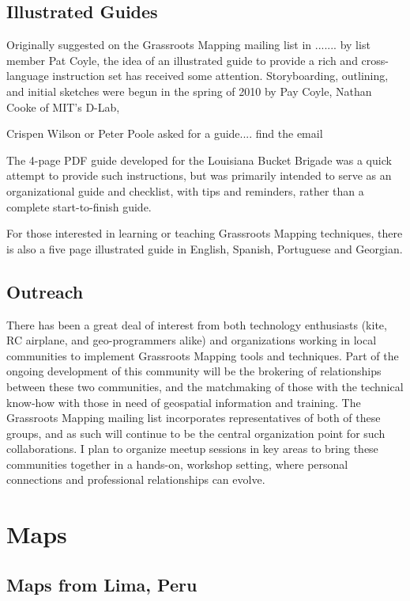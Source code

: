 \documentclass[11pt]{report}
\begin{document}
\section{Illustrated Guides}
\label{sec:guide}

Originally suggested on the Grassroots Mapping mailing list in ....... by list member Pat Coyle, the idea of an illustrated guide to provide a rich and cross-language instruction set has received some attention. Storyboarding, outlining, and initial sketches were begun in the spring of 2010 by Pay Coyle, Nathan Cooke of MIT's D-Lab, 

Crispen Wilson or Peter Poole asked for a guide.... find the email

The 4-page PDF guide developed for the Louisiana Bucket Brigade was a quick attempt to provide such instructions, but was primarily intended to serve as an organizational guide and checklist, with tips and reminders, rather than a complete start-to-finish guide. 

For those interested in learning or teaching Grassroots Mapping techniques, there is also a five page illustrated guide in English, Spanish, Portuguese and Georgian.

\section{Outreach}

There has been a great deal of interest from both technology enthusiasts (kite, RC airplane, and geo-programmers alike) and organizations working in local communities to implement Grassroots Mapping tools and techniques. Part of the ongoing development of this community will be the brokering of relationships between these two communities, and the matchmaking of those with the technical know-how with those in need of geospatial information and training. The Grassroots Mapping mailing list incorporates representatives of both of these groups, and as such will continue to be the central organization point for such collaborations. I plan to organize meetup sessions in key areas to bring these communities together in a hands-on, workshop setting, where personal connections and professional relationships can evolve.

\appendix

\chapter{Maps}

\section{Maps from Lima, Peru}
\end{document}
